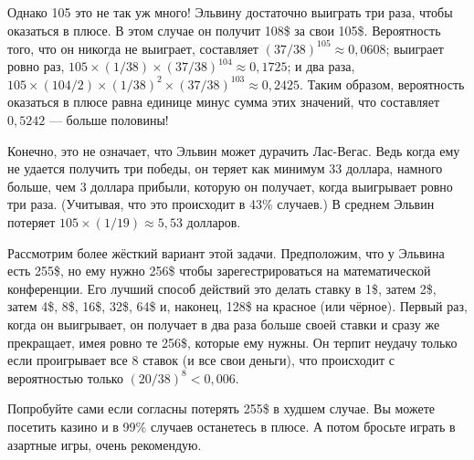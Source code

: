 Однако 105 это не так уж много!
Эльвину достаточно выиграть три раза, чтобы оказаться в плюсе.
В этом случае он получит 108\$ за свои 105\$.
Вероятность того, что он никогда не выиграет, составляет $(37/38)^{105} \approx 0{,}0608$;
выиграет ровно раз, $105 \times (1/38) \times (37/38)^{104} \approx 0{,}1725$;
и два раза, $105 \times (104/2) \times (1/38)^2 \times (37/38)^{103} \approx 0{,}2425$.
Таким образом, вероятность оказаться в плюсе равна единице минус сумма этих значений, что составляет $0{,}5242$ --- больше половины!

Конечно, это не означает, что Эльвин может дурачить Лас-Вегас.
Ведь когда ему не удается получить три победы, он теряет как минимум 33 доллара, намного больше, чем 3 доллара прибыли, которую он получает, когда выигрывает ровно три раза.
(Учитывая, что это происходит в 43\% случаев.)
В среднем Эльвин потеряет $105 \times (1/19) \approx 5,53$ долларов.

Рассмотрим более жёсткий вариант этой задачи.
Предположим, что у Эльвина есть 255\$, но ему нужно 256\$ чтобы зарегестрироваться на математической конференции.
Его лучший способ действий это делать ставку в 1\$, затем 2\$, затем 4\$, 8\$, 16\$, 32\$, 64\$ и, наконец, 128\$ на красное (или чёрное).
Первый раз, когда он выигрывает, он получает в два раза больше своей ставки и сразу же прекращает, имея ровно те 256\$, которые ему нужны.
Он терпит неудачу только если проигрывает все 8 ставок (и все свои деньги), что происходит с вероятностью только $(20/38)^8 < 0{,}006$.

Попробуйте сами если согласны потерять 255\$ в худшем случае.
Вы можете посетить казино и в 99\% случаев останетесь в плюсе.
А потом бросьте играть в азартные игры, очень рекомендую.
